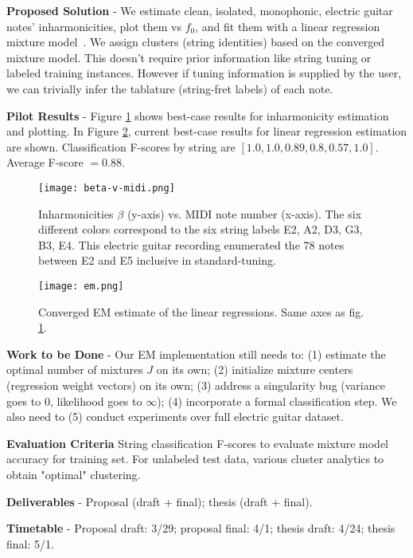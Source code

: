 \documentclass[12pt]{cmuthesis}
\begin{document}
\noindent
\textbf{Proposed Solution} -  We estimate clean, isolated, monophonic, electric guitar notes' inharmonicities, plot them vs $f_0$, and fit them with a linear regression mixture model~\cite{faria2010}. We assign clusters (string identities) based on the converged mixture model. This doesn't require prior information like string tuning or labeled training instances. However if tuning information is supplied by the user, we can trivially infer the tablature (string-fret labels) of each note.

\noindent
\textbf{Pilot Results} - Figure \ref{fig:beta} shows best-case results for inharmonicity estimation and plotting. In Figure \ref{fig:em}, current best-case results for linear regression estimation are shown. Classification F-scores by string are $[1.0, 1.0, 0.89, 0.8, 0.57, 1.0]$. Average F-score $ = 0.88$.

\begin{figure}[h]
\centering
\texttt{[image: beta-v-midi.png]}
\caption{Inharmonicities $\beta$ (y-axis) vs. MIDI note number (x-axis). The six different colors correspond to the six string labels E2, A2, D3, G3, B3, E4. This electric guitar recording enumerated the 78 notes between E2 and E5 inclusive in standard-tuning.}
\label{fig:beta}
\end{figure}

\begin{figure}[h]
\centering
\texttt{[image: em.png]}
\caption{Converged EM estimate of the linear regressions. Same axes as fig. \ref{fig:beta}.}
\label{fig:em}
\end{figure}

\noindent
\textbf{Work to be Done} - Our EM implementation still needs to: (1) estimate the optimal number of mixtures $J$ on its own; (2) initialize mixture centers (regression weight vectors) on its own; (3) address a singularity bug (variance goes to 0, likelihood goes to $\infty$); (4) incorporate a formal classification step. We also need to (5) conduct experiments over full electric guitar dataset.

\noindent
\textbf{Evaluation Criteria}
String classification F-scores to evaluate mixture model accuracy for training set. For unlabeled test data, various cluster analytics to obtain "optimal" clustering.

\noindent
\textbf{Deliverables} - Proposal (draft + final); thesis (draft + final).

\noindent
\textbf{Timetable} - Proposal draft: 3/29; proposal final: 4/1; thesis draft: 4/24; thesis final: 5/1.
\end{document}
